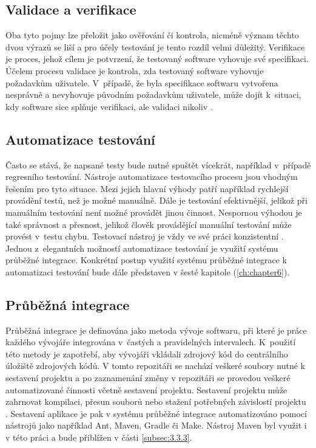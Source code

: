 \documentclass[
    color,   %
	table,   %
    twoside, %
    nolot, nolof
]{fithesis3}
\begin{document}
\subsection{Validace a verifikace}
Oba tyto pojmy lze přeložit jako ověřování či kontrola, nicméně význam těchto dvou výrazů se liší a pro účely testování je tento rozdíl velmi důležitý. Verifikace je proces, jehož cílem je potvrzení, že testovaný software vyhovuje své specifikaci. Účelem procesu validace je kontrola, zda testovaný software vyhovuje požadavkům uživatele. V~případě, že byla specifikace softwaru vytvořena nesprávně a nevyhovuje původním požadavkům uživatele, může dojít k~situaci, kdy software sice splňuje verifikaci, ale validaci nikoliv \cite{Patton}.

\subsection{Automatizace testování}
Často se stává, že napsané testy bude nutné spuštět vícekrát, například v~případě regresního testování. Nástroje automatizace testovacího procesu jsou vhodným řešením pro tyto situace. Mezi jejich hlavní výhody patří například rychlejší provádění testů, než je možné manuálně. Dále je testování efektivnější, jelikož při manuálním testování není možné provádět jinou činnost. Nespornou výhodou je také správnost a přesnost, jelikož člověk provádějící manuální testování může provést v~testu chybu. Testovací nástroj je vždy ve své práci konzistentní \cite{Patton}. Jednou z~elegantních možností automatizace testování je využití systému průběžné integrace. Konkrétní postup využití systému průběžné integrace k automatizaci testování bude dále představen v šesté kapitole (\ref{ch:chapter6}).

\subsection{Průběžná integrace}
Průběžná integrace je definována jako metoda vývoje softwaru, při které je práce každého vývojáře integrována v~častých a pravidelných intervalech. K~použití této metody je zapotřebí, aby vývojáři vkládali zdrojový kód do centrálního úložiště zdrojových kódů. V tomto repozitáři se nachází veškeré soubory nutné k sestavení projektu a po zaznamenání změny v repozitáři se provedou veškeré automatizované činnosti včetně sestavení projektu. Sestavení projektu může zahrnovat kompilaci, přesun souborů nebo stažení potřebných závislostí projektu \cite{Fowler}. Sestavení aplikace je pak v systému průběžné integrace automatizováno pomocí nástrojů jako například Ant, Maven, Gradle či Make. Nástroj Maven byl využit i v této práci a bude přiblížen v části \ref{subsec:3.3.3}.
\end{document}
